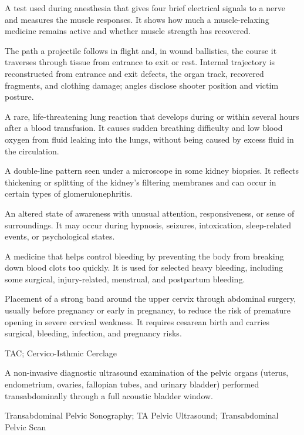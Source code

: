  A test used during anesthesia that gives four brief electrical signals to a nerve and measures the muscle responses. It shows how much a muscle-relaxing medicine remains active and whether muscle strength has recovered.

 The path a projectile follows in flight and, in wound ballistics, the course it
traverses through tissue from entrance to exit or rest. Internal trajectory is
reconstructed from entrance and exit defects, the organ track, recovered fragments, and
clothing damage; angles disclose shooter position and victim posture.

 A rare, life-threatening lung reaction that develops during or within several hours after a blood transfusion. It causes sudden breathing difficulty and low blood oxygen from fluid leaking into the lungs, without being caused by excess fluid in the circulation.

 A double-line pattern seen under a microscope in some kidney biopsies. It reflects thickening or splitting of the kidney’s filtering membranes and can occur in certain types of glomerulonephritis.

 An altered state of awareness with unusual attention, responsiveness, or sense of surroundings. It may occur during hypnosis, seizures, intoxication, sleep-related events, or psychological states.

 A medicine that helps control bleeding by preventing the body from breaking down blood clots too quickly. It is used for selected heavy bleeding, including some surgical, injury-related, menstrual, and postpartum bleeding.

 Placement of a strong band around the upper cervix through abdominal surgery, usually before pregnancy or early in pregnancy, to reduce the risk of premature opening in severe cervical weakness. It requires cesarean birth and carries surgical, bleeding, infection, and pregnancy risks.

\synonyms
TAC; Cervico-Isthmic Cerclage

 A non-invasive diagnostic ultrasound examination of the pelvic organs (uterus, endometrium, ovaries, fallopian tubes, and urinary bladder) performed transabdominally through a full acoustic bladder window.

\synonyms
Transabdominal Pelvic Sonography; TA Pelvic Ultrasound; Transabdominal Pelvic Scan

